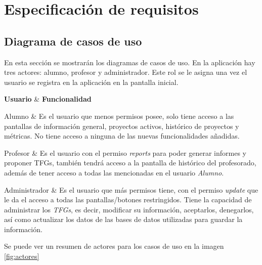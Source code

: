 \section{Especificación de requisitos}

\subsection{Diagrama de casos de uso}
En esta sección se mostrarán los diagramas de casos de uso. En la aplicación hay tres actores: alumno, profesor y administrador.
Este rol se le asigna una vez el usuario se registra en la aplicación en la pantalla inicial.


{\textbf{Usuario} & \textbf{Funcionalidad} \\}{
	Alumno & Es el usuario que menos permisos posee, solo tiene acceso a las pantallas de información general, proyectos activos, histórico de proyectos y métricas. No tiene acceso a ninguna de las nuevas funcionalidades añadidas. \\\hline
	
	Profesor & Es el usuario con el permiso \emph{reports} para poder generar informes y proponer TFGs, también tendrá acceso a la pantalla de histórico del profesorado, además de tener acceso a todas las mencionadas en el usuario \emph{Alumno}. \\\hline
	
	Administrador & Es el usuario que más permisos tiene, con el permiso \emph{update} que le da el acceso a todas las pantallas/botones restringidos. Tiene la capacidad de administrar los \emph{TFGs}, es decir, modificar su información, aceptarlos, denegarlos, así como actualizar los datos de las bases de datos utilizadas para guardar la información. \\
}
Se puede ver un resumen de actores para los casos de uso en la imagen \ref{fig:actores}

